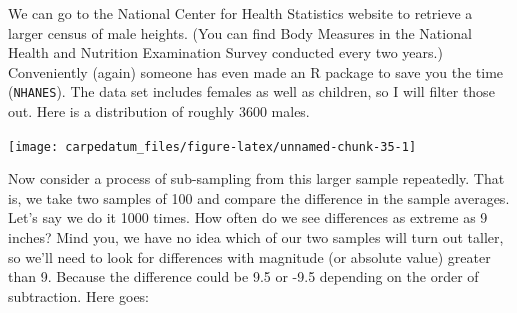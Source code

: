 \documentclass[openany]{book}
\newenvironment{Shaded}{\begin{snugshade}}{\end{snugshade}}
\newcommand{\CommentTok}[1]{\textcolor[rgb]{0.56,0.35,0.01}{\textit{#1}}}
\newcommand{\DataTypeTok}[1]{\textcolor[rgb]{0.13,0.29,0.53}{#1}}
\newcommand{\DecValTok}[1]{\textcolor[rgb]{0.00,0.00,0.81}{#1}}
\newcommand{\FloatTok}[1]{\textcolor[rgb]{0.00,0.00,0.81}{#1}}
\newcommand{\KeywordTok}[1]{\textcolor[rgb]{0.13,0.29,0.53}{\textbf{#1}}}
\newcommand{\NormalTok}[1]{#1}
\newcommand{\OperatorTok}[1]{\textcolor[rgb]{0.81,0.36,0.00}{\textbf{#1}}}
\newcommand{\StringTok}[1]{\textcolor[rgb]{0.31,0.60,0.02}{#1}}
\begin{document}
We can go to the National Center for Health Statistics website to retrieve a larger census of male heights. (You can find Body Measures in the National Health and Nutrition Examination Survey conducted every two years.) Conveniently (again) someone has even made an R package to save you the time (\texttt{NHANES}). The data set includes females as well as children, so I will filter those out. Here is a distribution of roughly 3600 males.

\begin{Shaded}
\end{Shaded}

\begin{center}\texttt{[image: carpedatum\_files/figure-latex/unnamed-chunk-35-1]} \end{center}

Now consider a process of sub-sampling from this larger sample repeatedly. That is, we take two samples of 100 and compare the difference in the sample averages. Let's say we do it 1000 times. How often do we see differences as extreme as 9 inches? Mind you, we have no idea which of our two samples will turn out taller, so we'll need to look for differences with magnitude (or absolute value) greater than 9. Because the difference could be 9.5 or -9.5 depending on the order of subtraction. Here goes:
\end{document}
